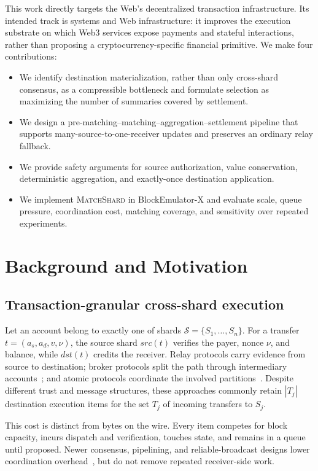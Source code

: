 \documentclass[sigconf,anonymous,review]{acmart}
\newcommand{\system}{\textsc{MatchShard}\xspace}
\begin{document}
This work directly targets the Web's decentralized transaction infrastructure. Its intended track is systems and Web infrastructure: it improves the execution substrate on which Web3 services expose payments and stateful interactions, rather than proposing a cryptocurrency-specific financial primitive. We make four contributions:

\begin{itemize}
  \item We identify destination materialization, rather than only cross-shard consensus, as a compressible bottleneck and formulate selection as maximizing the number of summaries covered by settlement.
  \item We design a pre-matching--matching--aggregation--settlement pipeline that supports many-source-to-one-receiver updates and preserves an ordinary relay fallback.
  \item We provide safety arguments for source authorization, value conservation, deterministic aggregation, and exactly-once destination application.
  \item We implement \system in BlockEmulator-X and evaluate scale, queue pressure, coordination cost, matching coverage, and sensitivity over repeated experiments.
\end{itemize}

\section{Background and Motivation}

\subsection{Transaction-granular cross-shard execution}

Let an account belong to exactly one of shards $\mathcal{S}=\{S_1,\ldots,S_n\}$. For a transfer $t=(a_s,a_d,v,\nu)$, the source shard $src(t)$ verifies the payer, nonce $\nu$, and balance, while $dst(t)$ credits the receiver. Relay protocols carry evidence from source to destination; broker protocols split the path through intermediary accounts~\cite{brokerchain2022,broker2earn2024}; and atomic protocols coordinate the involved partitions~\cite{sharper2021,byshard2021,cerberus2023}. Despite different trust and message structures, these approaches commonly retain $|T_j|$ destination execution items for the set $T_j$ of incoming transfers to $S_j$.

This cost is distinct from bytes on the wire. Every item competes for block capacity, incurs dispatch and verification, touches state, and remains in a queue until proposed. Newer consensus, pipelining, and reliable-broadcast designs lower coordination overhead~\cite{kronos2025,reticulum2024,xrbc2026,cherubim2024,hiba2025,hicocs2025}, but do not remove repeated receiver-side work.
\end{document}
